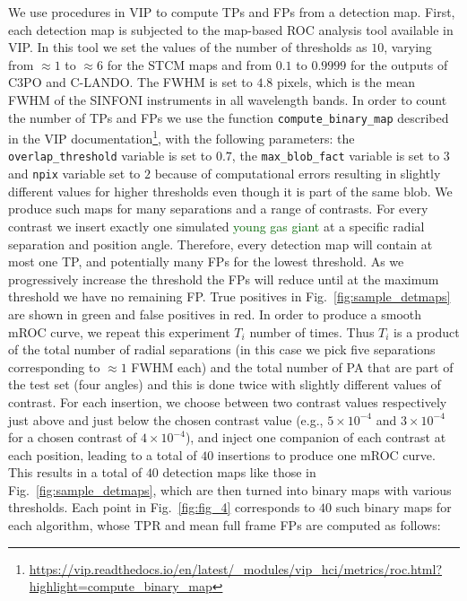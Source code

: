 \documentclass{aa}
\newcommand{\newchange}[1]{\textcolor{darkgreen}{#1}}
\begin{document}
We use procedures in VIP \citep{2017AJGomezVIP,2023Christiaens} to compute TPs and FPs from a detection map. First, each detection map is subjected to the map-based ROC analysis tool available in VIP. In this tool we set the values of the number of thresholds as $10$, varying from $\approx 1$ to $\approx 6$ for the STCM maps and from $0.1$ to $0.9999$ for the outputs of C3PO and C-LANDO. The FWHM is set to $4.8$ pixels, which is the mean FWHM of the SINFONI instruments in all wavelength bands. 
In order to count the number of TPs and FPs we use the function \texttt{compute\_binary\_map} described in the VIP documentation\footnote{\url{https://vip.readthedocs.io/en/latest/_modules/vip_hci/metrics/roc.html?highlight=compute_binary_map}}, with the following parameters: the \texttt{overlap\_threshold} variable is set to $0.7$, the \texttt{max\_blob\_fact} variable is set to $3$ and \texttt{npix} variable set to $2$ because of computational errors resulting in slightly different values for higher thresholds even though it is part of the same blob.
We produce such maps for many separations and a range of contrasts.
For every contrast we insert exactly one simulated \newchange{young gas giant} at a specific radial separation and position angle.
Therefore, every detection map will contain at most one TP, and potentially many FPs for the lowest threshold. 
As we progressively increase the threshold the FPs will reduce until at the maximum threshold we have no remaining FP. 
True positives in Fig.~\ref{fig:sample_detmaps} are shown in green and false positives in red.
In order to produce a smooth mROC curve, we repeat this experiment $T_{i}$ number of times.
Thus $T_{i}$ is a product of the total number of radial separations (in this case we pick five separations corresponding to $\approx 1$ FWHM each) and the total number of PA that are part of the test set (four angles) and this is done twice with slightly different values of contrast.
For each insertion, we choose between two contrast values respectively just above and just below the chosen contrast value (e.g., $5\times10^{-4}$ and $3\times10^{-4}$ for a chosen contrast of $4\times10^{-4}$), and inject one companion of each contrast at each position, leading to a total of $40$ insertions to produce one mROC curve.
This results in a total of $40$ detection maps like those in Fig.~\ref{fig:sample_detmaps}, which are then turned into binary maps with various thresholds. 
Each point in Fig.~\ref{fig:fig_4} corresponds to $40$ such binary maps for each algorithm, whose TPR and mean full frame FPs are computed as follows:
\end{document}
